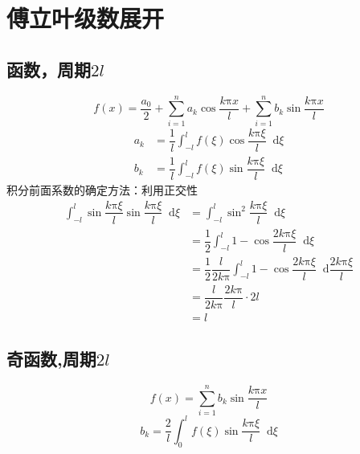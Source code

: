 \documentclass{article}
\newcommand*{\md}{\mathop{}\!\mathrm{d}}
\begin{document}
\section{傅立叶级数展开}

\subsection{函数，周期$2l$}

\begin{equation*}
  f(x) = \dfrac{a_{0}}{2} + \sum\limits_{i=1}^{n}a_{k} \cos \dfrac{k \mathrm{\pi} x}{l} + \sum\limits_{i=1}^{n}b_{k} \sin \dfrac{k \mathrm{\pi} x}{l} 
\end{equation*}
\begin{equation*}
  \begin{aligned}
    a_{k} &= \dfrac{1}{l} \int_{-l}^{l} f(\xi) \cos \dfrac{k \mathrm{\pi} \xi}{l} \md \xi \\
    b_{k} &= \dfrac{1}{l} \int_{-l}^{l} f(\xi) \sin \dfrac{k \mathrm{\pi} \xi}{l} \md \xi 
  \end{aligned}
\end{equation*}
积分前面系数的确定方法：利用正交性
\begin{equation*}
  \begin{aligned}
    \int_{-l}^{l} \sin \dfrac{k \mathrm{\pi} \xi}{l} \sin \dfrac{k \mathrm{\pi} \xi}{l} \md \xi &= \int_{-l}^{l} \sin^{2} \dfrac{k \mathrm{\pi} \xi}{l}  \md \xi \\
    &= \dfrac{1}{2} \int_{-l}^{l} 1 - \cos \dfrac{2 k \mathrm{\pi} \xi}{l}  \md \xi \\
    &= \dfrac{1}{2} \dfrac{l}{2 k \mathrm{\pi}} \int_{-l}^{l} 1 - \cos \dfrac{2 k \mathrm{\pi} \xi}{l}  \md \dfrac{2 k \mathrm{\pi} \xi}{l} \\
    &= \dfrac{l}{2 k \mathrm{\pi}} \dfrac{2 k \mathrm{\pi}}{l} \cdot 2l\\
    &= l
  \end{aligned}
\end{equation*}
\subsection{奇函数,周期$2l$}

\begin{equation*}
  f(x) = \sum\limits_{i=1}^{n}b_{k} \sin \dfrac{k \mathrm{\pi} x}{l} 
\end{equation*}
\begin{equation*}
  b_{k} = \dfrac{2}{l} \int_{0}^{l} f(\xi) \sin \dfrac{k \mathrm{\pi} \xi}{l} \md \xi 
\end{equation*}
\end{document}
